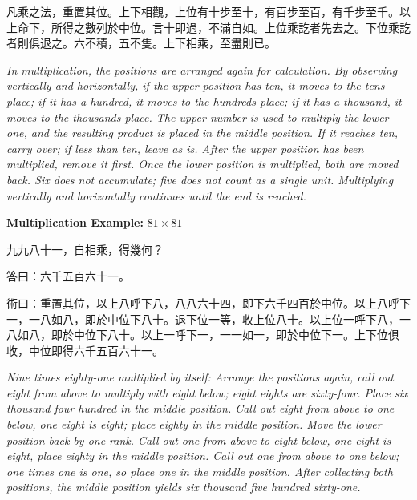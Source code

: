 \documentclass[11pt,a4paper]{article}
\newcommand{\zh}[1]{{\CJKfamily{}#1}}
\begin{document}
\begin{problembox}[title=\zh{凡乘之法}]
\zh{凡乘之法，重置其位。上下相觀，上位有十步至十，有百步至百，有千步至千。以上命下，所得之數列於中位。言十即過，不滿自如。上位乘訖者先去之。下位乘訖者則俱退之。六不積，五不隻。上下相乘，至盡則已。}
\end{problembox}

\textit{In multiplication, the positions are arranged again for calculation. By observing vertically and horizontally, if the upper position has ten, it moves to the tens place; if it has a hundred, it moves to the hundreds place; if it has a thousand, it moves to the thousands place. The upper number is used to multiply the lower one, and the resulting product is placed in the middle position. If it reaches ten, carry over; if less than ten, leave as is. After the upper position has been multiplied, remove it first. Once the lower position is multiplied, both are moved back. Six does not accumulate; five does not count as a single unit. Multiplying vertically and horizontally continues until the end is reached.}

\vspace{0.3cm}

\textbf{Multiplication Example:} $81 \times 81$

\begin{problembox}[title=\zh{問}]
\zh{九九八十一，自相乘，得幾何？}
\end{problembox}
\begin{answerbox}[title=\zh{答}]
\zh{答曰：六千五百六十一。}
\end{answerbox}
\begin{methodbox}[title=\zh{術}]
\zh{術曰：重置其位，以上八呼下八，八八六十四，即下六千四百於中位。以上八呼下一，一八如八，即於中位下八十。退下位一等，收上位八十。以上位一呼下八，一八如八，即於中位下八十。以上一呼下一，一一如一，即於中位下一。上下位俱收，中位即得六千五百六十一。}
\end{methodbox}

\textit{Nine times eighty-one multiplied by itself: Arrange the positions again, call out eight from above to multiply with eight below; eight eights are sixty-four. Place six thousand four hundred in the middle position. Call out eight from above to one below, one eight is eight; place eighty in the middle position. Move the lower position back by one rank. Call out one from above to eight below, one eight is eight, place eighty in the middle position. Call out one from above to one below; one times one is one, so place one in the middle position. After collecting both positions, the middle position yields six thousand five hundred sixty-one.}
\end{document}
